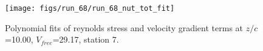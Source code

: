 \begin{figure}[H]
\centering
\texttt{[image: figs/run\_68/run\_68\_nut\_tot\_fit]}
\caption{Polynomial fits of reynolds stress and velocity gradient terms at $z/c$=10.00, $V_{free}$=29.17, station 7.}
\label{fig:run_68_nut_tot_fit}
\end{figure}


